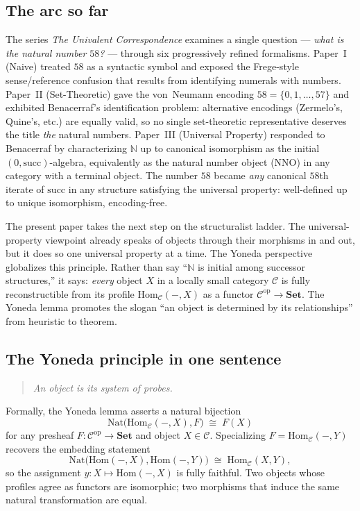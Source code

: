 \documentclass[12pt]{article}
\theoremstyle{definition}
\theoremstyle{remark}
\begin{document}
\subsection{The arc so far}

The series \emph{The Univalent Correspondence} examines a single question --- \emph{what is the natural number $58$?} --- through six progressively refined formalisms. Paper~I (Naive) treated $58$ as a syntactic symbol and exposed the Frege-style sense/reference confusion that results from identifying numerals with numbers. Paper~II (Set-Theoretic) gave the von~Neumann encoding $58 = \{0, 1, \ldots, 57\}$ and exhibited Benacerraf's identification problem: alternative encodings (Zermelo's, Quine's, etc.) are equally valid, so no single set-theoretic representative deserves the title \emph{the} natural numbers. Paper~III (Universal Property) responded to Benacerraf by characterizing $\mathbb{N}$ up to canonical isomorphism as the initial $(0, \mathrm{succ})$-algebra, equivalently as the natural number object (NNO) in any category with a terminal object. The number $58$ became \emph{any} canonical $58$th iterate of $\mathrm{succ}$ in any structure satisfying the universal property: well-defined up to unique isomorphism, encoding-free.

The present paper takes the next step on the structuralist ladder. The universal-property viewpoint already speaks of objects through their morphisms in and out, but it does so one universal property at a time. The Yoneda perspective globalizes this principle. Rather than say ``$\mathbb{N}$ is initial among successor structures,'' it says: \emph{every} object $X$ in a locally small category $\mathcal{C}$ is fully reconstructible from its profile $\mathrm{Hom}_{\mathcal{C}}(-, X)$ as a functor $\mathcal{C}^{\mathrm{op}} \to \mathbf{Set}$. The Yoneda lemma promotes the slogan ``an object is determined by its relationships'' from heuristic to theorem.

\subsection{The Yoneda principle in one sentence}

\begin{quote}
\emph{An object is its system of probes.}
\end{quote}
Formally, the Yoneda lemma asserts a natural bijection
\[
\mathrm{Nat}\big(\mathrm{Hom}_{\mathcal{C}}(-, X), F\big) \;\cong\; F(X)
\]
for any presheaf $F\colon \mathcal{C}^{\mathrm{op}} \to \mathbf{Set}$ and object $X \in \mathcal{C}$. Specializing $F = \mathrm{Hom}_{\mathcal{C}}(-, Y)$ recovers the embedding statement
\[
\mathrm{Nat}\big(\mathrm{Hom}(-, X), \mathrm{Hom}(-, Y)\big) \;\cong\; \mathrm{Hom}_{\mathcal{C}}(X, Y),
\]
so the assignment $y\colon X \mapsto \mathrm{Hom}(-, X)$ is fully faithful. Two objects whose profiles agree as functors are isomorphic; two morphisms that induce the same natural transformation are equal.
\end{document}
